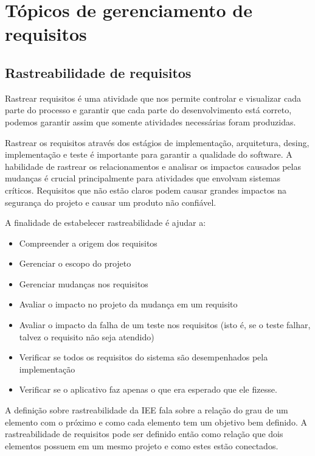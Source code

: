 \chapter{Tópicos de gerenciamento de requisitos}

\section{Rastreabilidade de requisitos}

	Rastrear requisitos é uma atividade que nos permite controlar e visualizar cada parte do processo e garantir que cada parte do
  desenvolvimento está correto, podemos garantir assim que somente atividades necessárias foram produzidas.

	Rastrear os requisitos através dos estágios de implementação, arquitetura, desing, implementação e teste é importante para garantir a
  qualidade do software. A habilidade de rastrear os relacionamentos e analisar os impactos causados pelas mudanças é crucial
  principalmente para atividades que envolvam sistemas críticos. Requisitos que não estão claros podem causar grandes impactos na
  segurança do projeto e causar um produto não confiável.

  A finalidade de estabelecer rastreabilidade é ajudar a:

  \begin{itemize}
    \item Compreender a origem dos requisitos
    \item Gerenciar o escopo do projeto
    \item Gerenciar mudanças nos requisitos
    \item Avaliar o impacto no projeto da mudança em um requisito
    \item Avaliar o impacto da falha de um teste nos requisitos (isto é, se o teste falhar, talvez o requisito não seja atendido)
    \item Verificar se todos os requisitos do sistema são desempenhados pela implementação
    \item Verificar se o aplicativo faz apenas o que era esperado que ele fizesse.
  \end{itemize}

	A definição sobre rastreabilidade da IEE fala sobre a relação do grau de um elemento com o próximo e como cada elemento tem um objetivo
  bem definido. A rastreabilidade de requisitos pode ser definido então como relação que dois elementos possuem em um mesmo projeto e
  como estes estão conectados.

